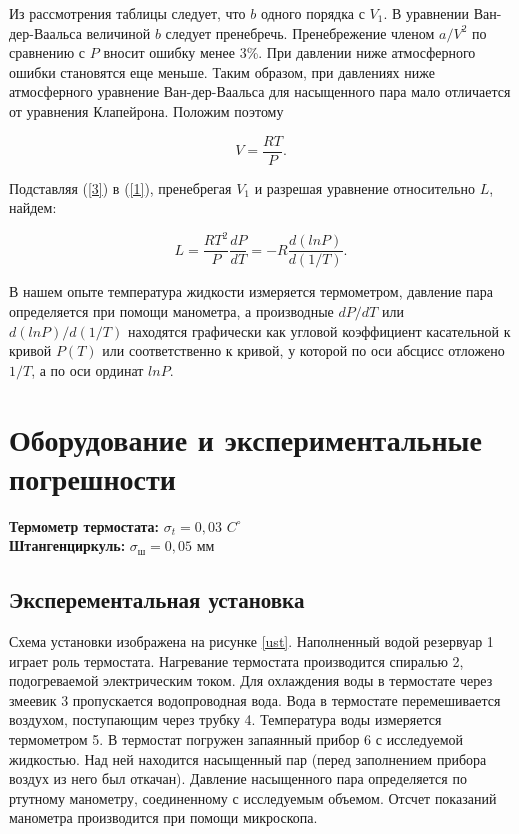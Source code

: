 \documentclass[a4paper,12pt]{article}
\begin{document}
Из рассмотрения таблицы следует, что $b$ одного порядка с $V_1$. В уравнении Ван-дер-Ваальса величиной $b$ следует пренебречь. Пренебрежение членом $a/V^2$ по сравнению с $P$ вносит ошибку менее 3\%. При давлении ниже атмосферного ошибки становятся еще меньше. Таким образом, при давлениях ниже атмосферного уравнение Ван-дер-Ваальса для насыщенного пара мало отличается от уравнения Клапейрона. Положим поэтому

\begin{equation}
   V = \frac{RT}{P}.
   \label{3}
\end{equation}

Подставляя (\ref{3}) в (\ref{1}), пренебрегая $V_1$ и разрешая уравнение относительно $L$, найдем:

\begin{equation}
   L = \frac{RT^2}{P}\frac{dP}{dT} = -R\frac{d(ln P)}{d(1/T)}.
   \label{4}
\end{equation}

В нашем опыте температура жидкости измеряется термометром, давление пара определяется при помощи манометра, а производные $dP/dT$ или $d(ln P )/d(1/T )$ находятся графически как угловой коэффициент касательной к кривой $P(T)$ или соответственно к кривой, у которой по оси абсцисс отложено $1/T$, а по оси ординат $ln P$.


\section{Оборудование и экспериментальные погрешности}

\textbf{Термометр термостата:} $\sigma_t = 0,03$ $C^\circ$ \\
\textbf{Штангенциркуль:} $\sigma_\text{ш} = 0,05$ мм \\

\subsection*{Эксперементальная установка}

Схема установки изображена на рисунке \ref{ust}. Наполненный водой резервуар 1 играет роль термостата. Нагревание термостата производится спиралью 2, подогреваемой электрическим током. Для охлаждения воды в термостате через змеевик 3 пропускается водопроводная вода. Вода в термостате перемешивается воздухом, поступающим через трубку 4. Температура воды измеряется термометром 5. В термостат погружен запаянный прибор 6 с исследуемой жидкостью. Над ней находится насыщенный пар (перед заполнением прибора воздух из него был откачан). Давление насыщенного пара определяется по ртутному манометру, соединенному с исследуемым объемом. Отсчет показаний манометра производится при помощи микроскопа.
\end{document}
